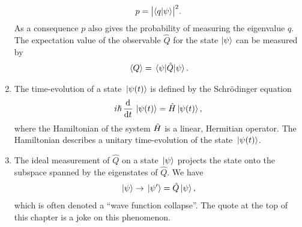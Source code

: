 \begin{enumerate}
\begin{align}
                    p = \abs{\braket{q}{\psi}}^2.
                \end{align}
                As a consequence $p$ also gives the probability of measuring the
                eigenvalue $q$.
                The expectation value of the observable $\hat{Q}$ for the state
                $\ket{\psi}$ can be measured by
                \begin{align}
                    \expval*{Q} = \expval*{\hat{Q}}{\psi}.
                \end{align}
            \item The time-evolution of a state $\ket*{\psi(t)}$ is defined by
                the Schrödinger equation
                \begin{align}
                    i\hslash \dod[]{}{t}\ket*{\psi(t)} = \hamil\ket*{\psi(t)},
                \end{align}
                where the Hamiltonian of the system $\hat{H}$ is a linear,
                Hermitian operator.
                The Hamiltonian describes a unitary time-evolution of the state
                $\ket*{\psi(t)}$.
            \item The ideal measurement of $\hat{Q}$ on a state $\ket*{\psi}$
                projects the state onto the subspace spanned by the eigenstates
                of $\hat{Q}$.
                We have
                \begin{align}
                    \ket*{\psi}
                    \to
                    \ket*{\psi'}
                    =
                    \hat{Q}\ket*{\psi},
                \end{align}
                which is often denoted a ``wave function collapse''.
                The quote at the top of this chapter is a joke on this
                phenomenon.
        \end{enumerate}

